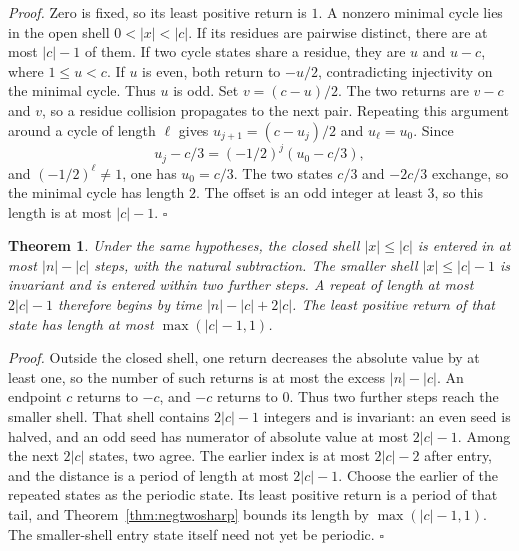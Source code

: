 \documentclass[11pt,letterpaper]{article}
\newtheorem{theorem}{Theorem}
\newenvironment{proof}{\noindent\textit{Proof.}}{\hfill\(\square\)}
\begin{document}
\begin{proof}
Zero is fixed, so its least positive return is \(1\). A nonzero minimal cycle lies in the open shell \(0<\lvert x\rvert<\lvert c\rvert\). If its residues are pairwise distinct, there are at most \(\lvert c\rvert-1\) of them. If two cycle states share a residue, they are \(u\) and \(u-c\), where \(1\le u<c\). If \(u\) is even, both return to \(-u/2\), contradicting injectivity on the minimal cycle. Thus \(u\) is odd. Set \(v=(c-u)/2\). The two returns are \(v-c\) and \(v\), so a residue collision propagates to the next pair. Repeating this argument around a cycle of length \(\ell\) gives \(u_{j+1}=(c-u_j)/2\) and \(u_\ell=u_0\). Since
\[
 u_j-c/3=(-1/2)^j(u_0-c/3),
\]
and \((-1/2)^\ell\ne1\), one has \(u_0=c/3\). The two states \(c/3\) and \(-2c/3\) exchange, so the minimal cycle has length \(2\). The offset is an odd integer at least \(3\), so this length is at most \(\lvert c\rvert-1\).
\end{proof}

\begin{theorem}
\label{thm:negtwodelay}
Under the same hypotheses, the closed shell \(\lvert x\rvert\le\lvert c\rvert\) is entered in at most \(\lvert n\rvert-\lvert c\rvert\) steps, with the natural subtraction. The smaller shell \(\lvert x\rvert\le\lvert c\rvert-1\) is invariant and is entered within two further steps. A repeat of length at most \(2\lvert c\rvert-1\) therefore begins by time \(\lvert n\rvert-\lvert c\rvert+2\lvert c\rvert\). The least positive return of that state has length at most \(\max(\lvert c\rvert-1,1)\).
\end{theorem}

\begin{proof}
Outside the closed shell, one return decreases the absolute value by at least one, so the number of such returns is at most the excess \(\lvert n\rvert-\lvert c\rvert\). An endpoint \(c\) returns to \(-c\), and \(-c\) returns to \(0\). Thus two further steps reach the smaller shell. That shell contains \(2\lvert c\rvert-1\) integers and is invariant: an even seed is halved, and an odd seed has numerator of absolute value at most \(2\lvert c\rvert-1\). Among the next \(2\lvert c\rvert\) states, two agree. The earlier index is at most \(2\lvert c\rvert-2\) after entry, and the distance is a period of length at most \(2\lvert c\rvert-1\). Choose the earlier of the repeated states as the periodic state. Its least positive return is a period of that tail, and Theorem~\ref{thm:negtwosharp} bounds its length by \(\max(\lvert c\rvert-1,1)\). The smaller-shell entry state itself need not yet be periodic.
\end{proof}
\end{document}
